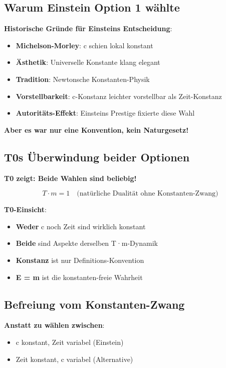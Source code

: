 \documentclass[12pt,a4paper]{article}
\newcommand{\Tfield}{T}
\begin{document}
	\subsection{Warum Einstein Option 1 wählte}
	
	\textbf{Historische Gründe für Einsteins Entscheidung}:
	\begin{itemize}
		\item \textbf{Michelson-Morley}: c schien lokal konstant
		\item \textbf{Ästhetik}: Universelle Konstante klang elegant
		\item \textbf{Tradition}: Newtonsche Konstanten-Physik
		\item \textbf{Vorstellbarkeit}: c-Konstanz leichter vorstellbar als Zeit-Konstanz
		\item \textbf{Autoritäts-Effekt}: Einsteins Prestige fixierte diese Wahl
	\end{itemize}
	
	\textbf{Aber es war nur eine Konvention, kein Naturgesetz!}
	
	\subsection{T0s Überwindung beider Optionen}
	
	\textbf{T0 zeigt: Beide Wahlen sind beliebig!}
	
	\begin{equation}
		\Tfield \cdot m = 1 \quad \text{(natürliche Dualität ohne Konstanten-Zwang)}
	\end{equation}
	
	\textbf{T0-Einsicht}:
	\begin{itemize}
		\item \textbf{Weder} c noch Zeit sind wirklich konstant
		\item \textbf{Beide} sind Aspekte derselben T·m-Dynamik
		\item \textbf{Konstanz} ist nur Definitions-Konvention
		\item \textbf{E = m} ist die konstanten-freie Wahrheit
	\end{itemize}
	
	\subsection{Befreiung vom Konstanten-Zwang}
	
	\textbf{Anstatt zu wählen zwischen}:
	\begin{itemize}
		\item c konstant, Zeit variabel (Einstein)
		\item Zeit konstant, c variabel (Alternative)
	\end{itemize}
	
\end{document}
